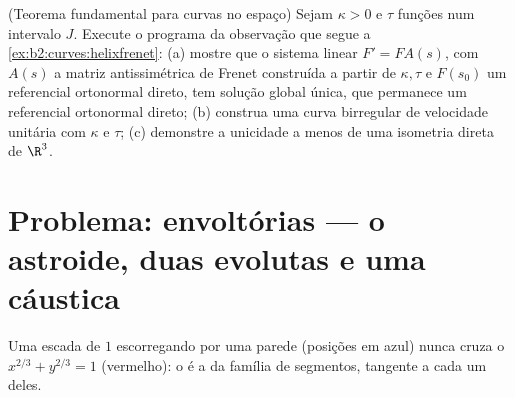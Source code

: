 \begin{exercise}[$\star\star\star$]\label{exo:b2:curves:12}
(Teorema fundamental para curvas no espaço) Sejam $\kappa > 0$ e
$\tau$ funções  num intervalo $J$. Execute
o programa da observação que segue a
\cref{ex:b2:curves:helixfrenet}: (a) mostre que o sistema
linear $F' = FA(s)$, com $A(s)$ a matriz antissimétrica
de Frenet construída a partir de $\kappa, \tau$ e $F(s_0)$ um referencial
ortonormal direto, tem solução global única, que permanece
um referencial ortonormal direto; (b) construa uma curva birregular
de velocidade unitária com  $\kappa$ e  $\tau$;
(c) demonstre a unicidade a menos de uma isometria direta de $\R^3$.
\end{exercise}

\section{Problema: envoltórias --- o astroide, duas evolutas e
uma cáustica}

\begin{omfigure}

{\small Uma escada de  $1$ escorregando por uma parede (posições
em azul) nunca cruza o  $x^{2/3} + y^{2/3} = 1$
(vermelho): o  é a \emph{} da família de
segmentos, tangente a cada um deles.}
\end{omfigure}


